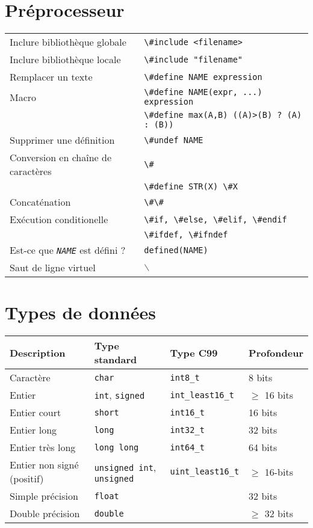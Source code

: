 \documentclass{article}
\newcommand{\bs}{$\backslash$}
\newcommand{\NAME}{\emph{NAME}}
\newcommand{\cd}{\lstinline}
\begin{document}
\begin{multicols*}{3}
\section*{Préprocesseur}

\begin{tabularx}{\linewidth}{Xl}
  Inclure bibliothèque globale       & \cd{\#include <filename>} \\
  Inclure bibliothèque locale        & \cd{\#include "filename"} \\
  Remplacer un texte                 & \cd{\#define NAME expression} \\
  Macro                              & \cd{\#define NAME(expr, ...) expression} \\
                                     & \cd{\#define max(A,B) ((A)>(B) ? (A) : (B))} \\
  Supprimer une définition           & \cd{\#undef NAME} \\
  Conversion en chaîne de caractères & \cd{\#} \\
                                     & \cd{\#define STR(X) \#X} \\
  Concaténation                      & \cd{\#\#} \\
  Exécution conditionelle            & \cd{\#if, \#else, \#elif, \#endif} \\
                                     & \cd{\#ifdef, \#ifndef} \\
  Est-ce que \texttt{\NAME} est défini ? & \cd{defined(NAME)} \\
  Saut de ligne virtuel              & \bs
\end{tabularx}

\section*{Types de données}

  \begin{tabularx}{\linewidth}{Xlll}
    \bf Description & \bf Type standard & \bf Type C99 & \bf Profondeur \\
    \hline
    Caractère                   & \cd{char}      & \cd {int8_t} & 8 bits \\
    \hline
    Entier                      & \cd{int}, \cd{signed}  & \cd {int_least16_t} & $\geq$ 16 bits \\
    Entier court                & \cd{short}     & \cd {int16_t} & 16 bits \\
    Entier long                 & \cd{long}      & \cd {int32_t} & 32 bits \\
    Entier très long            & \cd{long long} & \cd {int64_t} & 64 bits \\
    Entier non signé (positif)  & \cd{unsigned int}, \cd{unsigned} & \cd{uint_least16_t} & $\geq$ 16-bits \\
    \hline
    Simple précision            & \cd{float}     &  & 32 bits \\
    Double précision            & \cd{double}    &  & $\geq$ 32 bits \\
  \end{tabularx}


\end{multicols*}
\end{document}
